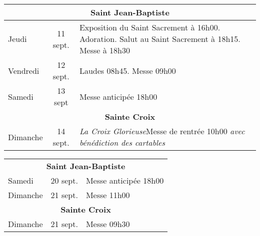 \documentclass[french,11pt]{article}
\begin{document}
\begin{tabular} {lcp{9cm}}
\multicolumn{3}{c}{\textbf{Saint Jean-Baptiste} } \\ \hline
Jeudi    & 11 sept. &
Exposition du Saint Sacrement à 16h00. Adoration. Salut au Saint Sacrement à 18h15. Messe à 18h30 
 \\ \hline
Vendredi & 12 sept. & Laudes 08h45. Messe 09h00 \\ \hline
Samedi   & 13 sept & Messe anticipée 18h00 \\ \hline
\multicolumn{3}{c}{\textbf{Sainte Croix} } \\ \hline
Dimanche  & 14 sept. & \emph{La Croix Glorieuse}\newline Messe de rentrée 10h00 \emph{avec bénédiction des cartables}\\ \hline
\end{tabular}

\begin{framed}
\begin{tabular} {lcp{7cm}}
\multicolumn{3}{c}{\textbf{Saint Jean-Baptiste} } \\
Samedi & 20 sept. &  Messe anticipée 18h00 \\
Dimanche & 21 sept. &  Messe 11h00 \\
\multicolumn{3}{c}{\textbf{Sainte Croix} } \\
Dimanche & 21 sept. &  Messe 09h30 \\
\end{tabular}
\end{framed}
\end{document}
